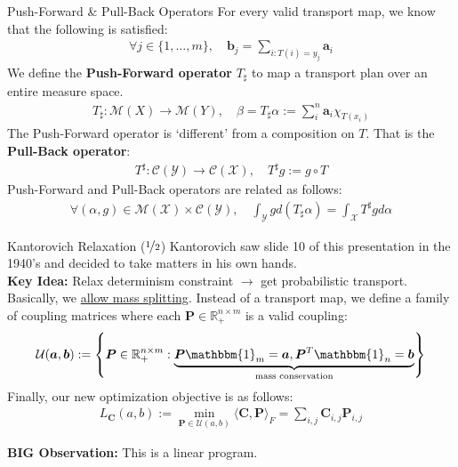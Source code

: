 \documentclass{beamer}
\begin{document}
\begin{frame}{Push-Forward \& Pull-Back Operators}
	For every valid transport map, we know that the following is satisfied:
	\begin{gather}
		\forall j \in \{1, \ldots, m\}, \quad \bm{b}_j = \sum_{i : T(i) = y_j} \bm{a}_i
	\end{gather} \pause
	We define the \textbf{Push-Forward operator} $T_\sharp$ to map a transport plan over an entire measure space.
	\begin{gather}
		T_\sharp: \mathcal{M}(X) \rightarrow \mathcal{M}(Y), \quad \beta = T_\sharp \alpha := \sum_i^n \bm{a}_i \chi_{T(x_i)}
	\end{gather} \pause
	The Push-Forward operator is `different' from a composition on $T$. That is the \textbf{Pull-Back operator}:
	\begin{gather}
		T^\sharp: \mathcal{C}(\mathcal{Y}) \rightarrow \mathcal{C}(\mathcal{X}), \quad T^\sharp g := g \circ T
	\end{gather} \pause
	Push-Forward and Pull-Back operators are related as follows:
	\begin{gather}
		\forall (\alpha, g) \in \mathcal{M}(\mathcal{X}) \times \mathcal{C}(\mathcal{Y}), \quad \int_\mathcal{Y} g d (T_\sharp \alpha) = \int_{\mathcal{X}} T^\sharp g d \alpha
	\end{gather}
\end{frame}

\begin{frame}{Kantorovich Relaxation ($\nicefrac{1}{2}$)}
	Kantorovich saw slide 10 of this presentation in the 1940's and decided to take matters in his own hands. \pause \newline \\

	\textbf{Key Idea:} Relax determinism constraint $\rightarrow$ get probabilistic transport. \pause \newline \\

	Basically, we \underline{allow mass splitting}. \pause Instead of a transport map, we define a family of coupling matrices where each $\bm{P} \in \mathbb{R}^{n \times m}_+$ is a valid coupling:
	\begin{gather}
		\mathcal{U}(\bm{a}, \bm{b}) := \left\{ \bm{P} \in \mathbb{R}^{n \times m}_+ : \underbrace{\bm{P} \mathbbm{1}_m = \bm{a}, \bm{P}^T \mathbbm{1}_n = \bm{b}}_{\text{mass conservation}} \right\}
	\end{gather} \pause
	Finally, our new optimization objective is as follows:
	\begin{gather}
		L_{\bm{C}}(a, b) := \min_{\bm{P} \in \mathcal{U}(a, b)} \langle \bm{C}, \bm{P} \rangle_F = \sum_{i, j} \bm{C}_{i,j} \bm{P}_{i, j}
	\end{gather} \pause

	\textbf{BIG Observation:} This is a linear program.
\end{frame}
\end{document}
